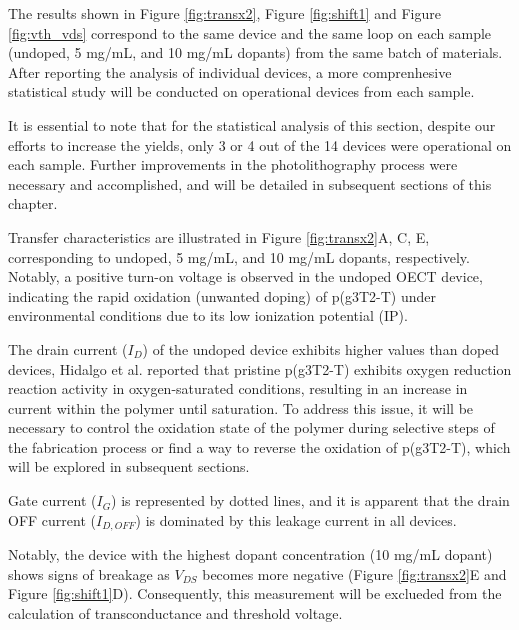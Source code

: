 The results shown in Figure \ref{fig:transx2}, Figure \ref{fig:shift1} and Figure \ref{fig:vth_vds} correspond to the same device and the same loop on each sample (undoped, 5 mg/mL, and 10 mg/mL dopants) from the same batch of materials. After reporting the analysis of individual devices, a more comprenhesive statistical study will be conducted on operational devices from each sample. 

It is essential to note that for the statistical analysis of this section, despite our efforts to increase the yields, only 3 or 4 out of the 14 devices were operational on each sample. Further improvements in the photolithography process were necessary and accomplished, and will be detailed in subsequent sections of this chapter. 

Transfer characteristics are illustrated in Figure \ref{fig:transx2}A, C, E, corresponding to undoped, 5 mg/mL, and 10 mg/mL dopants, respectively. Notably, a positive turn-on voltage is observed in the undoped OECT device, indicating the rapid oxidation (unwanted doping) of p(g3T2-T) under environmental conditions due to its low ionization potential (IP). 

The drain current ($I_{D}$) of the undoped device exhibits higher values than doped devices, Hidalgo et al.  \cite{hidalgocastilloSimultaneousPerformanceStability2022a} reported that pristine p(g3T2-T) exhibits oxygen reduction reaction activity in oxygen-saturated conditions, resulting in an increase in current within the polymer until saturation. To address this issue, it will be necessary to control the oxidation state of the polymer during selective steps of the fabrication process or find a way to reverse the oxidation of p(g3T2-T), which will be explored in subsequent sections.

Gate current ($I_{G}$) is represented by dotted lines, and it is apparent that the drain OFF current ($I_{D,OFF}$) is dominated by this leakage current in all devices. %

Notably, the device with the highest dopant concentration (10 mg/mL dopant) shows signs of breakage as $V_{DS}$ becomes more negative (Figure \ref{fig:transx2}E and Figure \ref{fig:shift1}D). Consequently, this measurement will be exclueded from the calculation of transconductance and threshold voltage.

